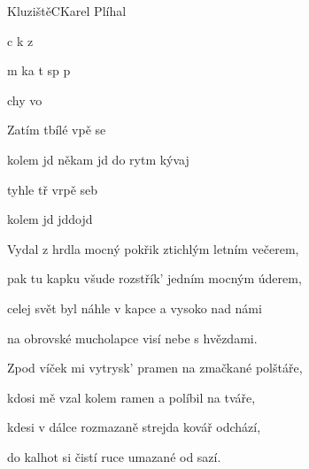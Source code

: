 \begin{song}{Kluziště}{C}{Karel Plíhal}

\begin{SBVerse}

  c k  z 

    m ka t sp p

   chy vo

      

\end{SBVerse}

\begin{SBChorus}

   Zatím tbílé vpě se

   kolem jd někam jd do rytm kývaj

   tyhle tř vrpě seb

   kolem jd jddojd

  \end{SBChorus}

\begin{SBVerse}

   Vydal z hrdla mocný pokřik ztichlým letním večerem,

   pak tu kapku všude rozstřík' jedním mocným úderem,

   celej svět byl náhle v kapce a vysoko nad námi

   na obrovské mucholapce visí nebe s hvězdami.

\end{SBVerse}

\begin{SBVerse}

   Zpod víček mi vytrysk' pramen na zmačkané polštáře,

   kdosi mě vzal kolem ramen a políbil na tváře,

   kdesi v dálce rozmazaně strejda kovář odchází,

   do kalhot si čistí ruce umazané od sazí.

 \end{SBVerse}

 \end{song} 

\pagebreak